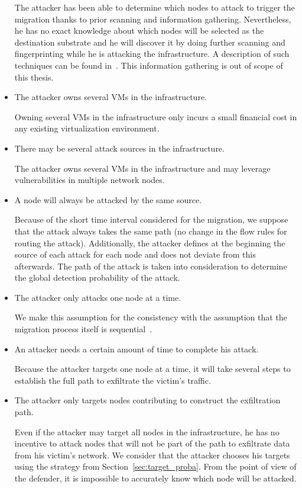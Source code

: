 \begin{itemize}
    The attacker has been able to determine which nodes to attack to trigger the migration thanks to prior scanning and information gathering. 
    Nevertheless, he has no exact knowledge about which nodes will be selected as the destination substrate and he will discover it by doing further scanning and fingerprinting  while he is attacking the infrastructure.  
    A description of such techniques can be found in~\cite{Hong2015,Sphinx-Dhawan2015}.
    This information gathering is out of scope of this thesis.
    
    \item The attacker owns several VMs in the infrastructure.
    
     Owning several VMs in the infrastructure only incurs a small financial cost in any existing virtualization environment.
 
    
    \item There may be several attack sources in the infrastructure.
    
    The attacker owns several VMs in the infrastructure and may leverage vulnerabilities in multiple network nodes.
    
    \item A node will always be attacked by the same source.
    
    Because of the short time interval considered for the migration, we suppose that the attack always takes the same path (\ie no change in the flow rules for routing the attack).
    Additionally, the attacker defines at the beginning the source of each attack for each node and does not deviate from this afterwards.
    The path of the attack is taken into consideration to determine the global detection probability of the attack.
    
    \item The attacker only attacks one node at a time.
    
    We make this assumption for the consistency with the assumption that the migration process itself is sequential~\cite{Lime-Ghorbani2014}.
    
    \item An attacker needs a certain amount of time to complete his attack.
    
    Because the attacker targets one node at a time, it will take several steps to establish the full path to exfiltrate the victim's traffic. 
    
    \item The attacker only targets nodes contributing to construct the exfiltration path.
    
     Even if the attacker may target all nodes in the infrastructure, he has no incentive to attack nodes that will not be part of the path to exfiltrate data from his victim's network. We consider that the attacker chooses his targets using the strategy from Section~\ref{sec:target_proba}.
    From the point of view of the defender, it is impossible to accurately know which node will be attacked.
    
\end{itemize}




